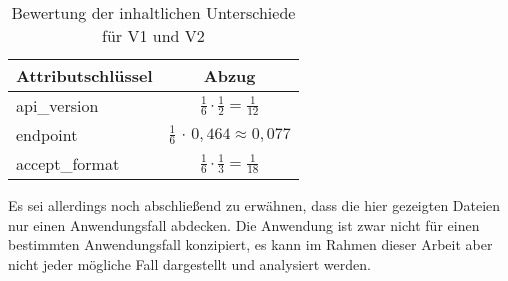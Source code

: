 \begin{table}[]
\centering
\begin{tabular}{|l|c|}
\hline
Attributschlüssel   & Abzug \\ \hline
api\_version          & \large$ \frac{1}{6} \cdot \frac{1}{2} = \frac{1}{12} $ \\ \hline
endpoint             & \large$ \frac{1}{6} \, \cdot \, $\small $ 0,464 \approx 0,077 $ \\ \hline
accept\_format       & \large$ \frac{1}{6} \cdot \frac{1}{3} = \frac{1}{18} $  \\ \hline
\end{tabular}



\caption{Bewertung der inhaltlichen Unterschiede für V1 und V2}
\label{table:structCompDiff}
\end{table}

Es sei allerdings noch abschließend zu erwähnen, dass die hier gezeigten Dateien nur einen Anwendungsfall abdecken. Die Anwendung ist zwar nicht für einen bestimmten Anwendungsfall konzipiert, es kann im Rahmen dieser Arbeit aber nicht jeder mögliche Fall dargestellt und analysiert werden. 
